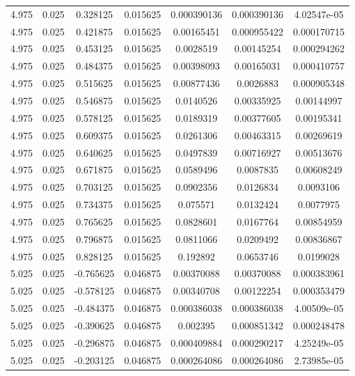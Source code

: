 \begin{table}[bh]
\begin{center}
{\begin{tabular}{ccccccc}
4.975	 & 0.025 & 	0.328125	 & 0.015625	 & 0.000390136	 & 0.000390136	 & 4.02547e-05 \\ 
4.975	 & 0.025 & 	0.421875	 & 0.015625	 & 0.00165451	 & 0.000955422	 & 0.000170715 \\ 
4.975	 & 0.025 & 	0.453125	 & 0.015625	 & 0.0028519	 & 0.00145254	 & 0.000294262 \\ 
4.975	 & 0.025 & 	0.484375	 & 0.015625	 & 0.00398093	 & 0.00165031	 & 0.000410757 \\ 
4.975	 & 0.025 & 	0.515625	 & 0.015625	 & 0.00877436	 & 0.0026883	 & 0.000905348 \\ 
4.975	 & 0.025 & 	0.546875	 & 0.015625	 & 0.0140526	 & 0.00335925	 & 0.00144997 \\ 
4.975	 & 0.025 & 	0.578125	 & 0.015625	 & 0.0189319	 & 0.00377605	 & 0.00195341 \\ 
4.975	 & 0.025 & 	0.609375	 & 0.015625	 & 0.0261306	 & 0.00463315	 & 0.00269619 \\ 
4.975	 & 0.025 & 	0.640625	 & 0.015625	 & 0.0497839	 & 0.00716927	 & 0.00513676 \\ 
4.975	 & 0.025 & 	0.671875	 & 0.015625	 & 0.0589496	 & 0.0087835	 & 0.00608249 \\ 
4.975	 & 0.025 & 	0.703125	 & 0.015625	 & 0.0902356	 & 0.0126834	 & 0.0093106 \\ 
4.975	 & 0.025 & 	0.734375	 & 0.015625	 & 0.075571	 & 0.0132424	 & 0.0077975 \\ 
4.975	 & 0.025 & 	0.765625	 & 0.015625	 & 0.0828601	 & 0.0167764	 & 0.00854959 \\ 
4.975	 & 0.025 & 	0.796875	 & 0.015625	 & 0.0811066	 & 0.0209492	 & 0.00836867 \\ 
4.975	 & 0.025 & 	0.828125	 & 0.015625	 & 0.192892	 & 0.0653746	 & 0.0199028 \\ 
5.025	 & 0.025 & 	-0.765625	 & 0.046875	 & 0.00370088	 & 0.00370088	 & 0.000383961 \\ 
5.025	 & 0.025 & 	-0.578125	 & 0.046875	 & 0.00340708	 & 0.00122254	 & 0.000353479 \\ 
5.025	 & 0.025 & 	-0.484375	 & 0.046875	 & 0.000386038	 & 0.000386038	 & 4.00509e-05 \\ 
5.025	 & 0.025 & 	-0.390625	 & 0.046875	 & 0.002395	 & 0.000851342	 & 0.000248478 \\ 
5.025	 & 0.025 & 	-0.296875	 & 0.046875	 & 0.000409884	 & 0.000290217	 & 4.25249e-05 \\ 
5.025	 & 0.025 & 	-0.203125	 & 0.046875	 & 0.000264086	 & 0.000264086	 & 2.73985e-05 \\ 

\end{tabular}}
\end{center}
\end{table}
